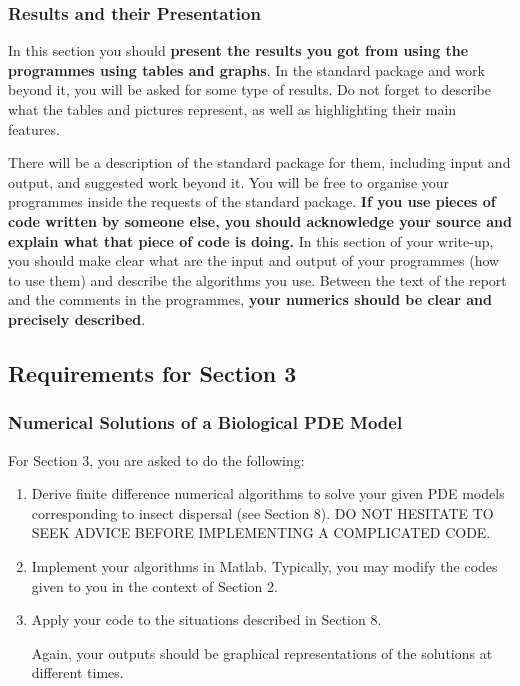 \documentclass[12pt]{article}
\begin{document}
\subsubsection{Results and their Presentation}

In this section you should
{\magenta\bf present the results you got from using the programmes using tables and graphs}.
In the standard package and work beyond it, you will be asked for some type of results.
Do not forget to describe what the tables and pictures represent, as well as highlighting their main features.

There will be a description of the standard package for them, including input and output,
and suggested work beyond it.
You will be free to organise your programmes inside the requests of the standard package.
{\bf\magenta If you use pieces of code written by someone else, you should acknowledge your source
and explain what that piece of code is doing.} In this section of your write-up,
you should make clear what are the input
and output of your programmes (how to use them) and describe the algorithms you use.
Between the text of the report and the comments in the programmes,
{\bf\magenta your numerics should be clear and precisely described}.

\newpage

\subsection{Requirements for Section 3}

\subsubsection{Numerical Solutions of a Biological PDE Model}

For Section 3, you are asked to do the following:
\begin{enumerate}\item Derive finite difference numerical algorithms to solve your given PDE models 
corresponding to insect dispersal (see Section 8). DO NOT HESITATE TO SEEK ADVICE BEFORE IMPLEMENTING A COMPLICATED CODE.
\item Implement your algorithms in Matlab. Typically, you may modify the codes
given to you in the context of Section 2.
\item Apply your code to the situations described in Section 8.

Again, your outputs should be graphical representations of the solutions at different times.
\end{enumerate}
\end{document}
